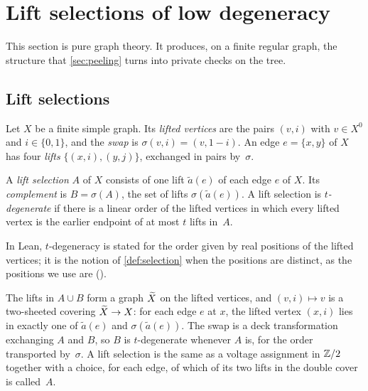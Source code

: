 \section{Lift selections of low degeneracy}\label{sec:lifts}

This section is pure graph theory. It produces, on a finite regular graph, the structure that \cref{sec:peeling} turns
into private checks on the tree.

\subsection{Lift selections}\label{sec:lifts-def}

Let $X$ be a finite simple graph. Its \emph{lifted vertices} are the pairs $(v,i)$ with $v\in X^0$ and $i\in\{0,1\}$,
and the \emph{swap} is $\sigma(v,i)=(v,1-i)$. An edge $e=\{x,y\}$ of $X$ has four \emph{lifts}
$\{(x,i),(y,j)\}$, exchanged in pairs by~$\sigma$.

\begin{definition}\label{def:selection}
A \emph{lift selection} $A$ of $X$ consists of one lift $\tilde a(e)$ of each edge $e$ of $X$. Its \emph{complement} is
$B=\sigma(A)$, the set of lifts $\sigma(\tilde a(e))$. A lift selection is \emph{$t$-degenerate} if there is a linear
order of the lifted vertices in which every lifted vertex is the earlier endpoint of at most $t$ lifts in~$A$.
\end{definition}

In Lean, $t$-degeneracy is stated for the order given by real positions of the lifted vertices; it is the notion of
\cref{def:selection} when the positions are distinct, as the positions we use are ().

The lifts in $A\cup B$ form a graph $\widetilde X$ on the lifted vertices, and $(v,i)\mapsto v$ is a two-sheeted covering
$\widetilde X\to X$: for each edge $e$ at $x$, the lifted vertex $(x,i)$ lies in exactly one of $\tilde a(e)$ and
$\sigma(\tilde a(e))$. The swap is a deck transformation exchanging $A$ and $B$, so $B$ is $t$-degenerate whenever $A$
is, for the order transported by~$\sigma$. A lift selection is the same as a voltage assignment in $\mathbb{Z}/2$ together with
a choice, for each edge, of which of its two lifts in the double cover is called~$A$.

